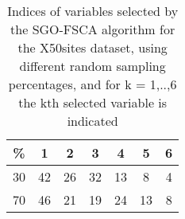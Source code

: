 \begin{table}
	\begin{center}
		\begin{tabular}{c c c c c c c}
			\% & 1 & 2 & 3 & 4 & 5 & 6 \\
			\hline
			30 & 42 & 26 & 32 & 13 & 8 & 4 \\
			70 & 46 & 21 & 19 & 24 & 13 & 8 \\
		\end{tabular}
	\end{center}
	\caption{Indices of variables selected by the SGO-FSCA algorithm for the X50sites dataset, using different random sampling percentages, and for k = 1,..,6 the kth selected variable is indicated}
\end{table}